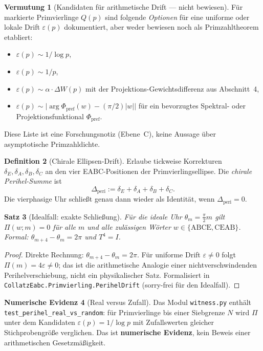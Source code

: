 \documentclass[11pt,a4paper]{article}
\theoremstyle{definition}
\newtheorem{definition}{Definition}[section]
\newtheorem{numerischeevidenz}[definition]{Numerische Evidenz}
\newtheorem{vermutung}[definition]{Vermutung}
\theoremstyle{plain}
\newtheorem{satz}[definition]{Satz}
\begin{document}
	\begin{vermutung}[Kandidaten für arithmetische Drift — nicht bewiesen]
		Für markierte Primvierlinge $Q(p)$ sind folgende \emph{Optionen} für eine uniforme oder lokale Drift $\varepsilon(p)$ dokumentiert, aber weder bewiesen noch als Primzahltheorem etabliert:
		\begin{itemize}[nosep]
			\item $\varepsilon(p)\sim 1/\log p$,
			\item $\varepsilon(p)\sim 1/p$,
			\item $\varepsilon(p)\sim \alpha\cdot\Delta W(p)$ mit der Projektions-Gewichtsdifferenz aus Abschnitt~4,
			\item $\varepsilon(p)\sim \bigl|\arg\Phi_{\mathrm{pref}}(w)-(\pi/2)|w|\bigr|$ für ein bevorzugtes Spektral- oder Projektionsfunktional $\Phi_{\mathrm{pref}}$.
		\end{itemize}
		Diese Liste ist eine Forschungsnotiz (Ebene~C), keine Aussage über asymptotische Primzahldichte.
	\end{vermutung}
	
	\begin{definition}[Chirale Ellipsen-Drift]
		Erlaube tickweise Korrekturen $\delta_E,\delta_A,\delta_B,\delta_C$ an den vier EABC-Positionen der Primvierlingsellipse. Die \emph{chirale Perihel-Summe} ist
		\[
		\Delta_{\mathrm{peri}}:=\delta_E+\delta_A+\delta_B+\delta_C.
		\]
		Die vierphasige Uhr schließt genau dann wieder als Identität, wenn $\Delta_{\mathrm{peri}}=0$.
	\end{definition}
	
	\begin{satz}[Idealfall: exakte Schließung]
		Für die ideale Uhr $\theta_m=\tfrac{\pi}{2}m$ gilt $\Pi(w;m)=0$ für alle $m$ und alle zulässigen Wörter $w\in\{\mathrm{ABCE},\mathrm{CEAB}\}$. Formal: $\theta_{m+4}-\theta_m=2\pi$ und $T^4=I$.
	\end{satz}
	
	\begin{proof}
		Direkte Rechnung: $\theta_{m+4}-\theta_m=2\pi$. Für uniforme Drift $\varepsilon\neq 0$ folgt $\Pi(m)=4\varepsilon\neq 0$; das ist die arithmetische Analogie einer nichtverschwindenden Perihelverschiebung, nicht ein physikalischer Satz. Formalisiert in \texttt{CollatzEabc.Primvierling.PerihelDrift} (sorry-frei für den Idealfall).
	\end{proof}
	
	\begin{numerischeevidenz}[Real versus Zufall]
		Das Modul \texttt{witness.py} enthält \texttt{test\_perihel\_real\_vs\_random}: für Primvierlinge bis einer Siebgrenze $N$ wird $\Pi$ unter dem Kandidaten $\varepsilon(p)=1/\log p$ mit Zufallswerten gleicher Stichprobengröße verglichen. Das ist \textbf{numerische Evidenz}, kein Beweis einer arithmetischen Gesetzmäßigkeit.
	\end{numerischeevidenz}
	
\end{document}
